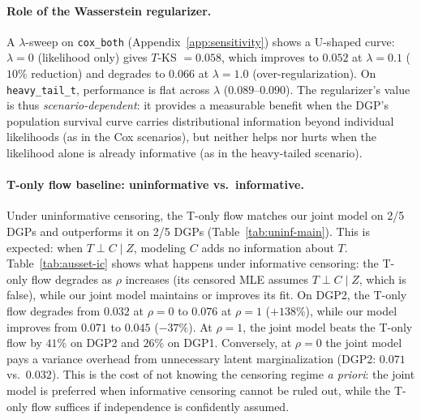 \paragraph{Role of the Wasserstein regularizer.}
A $\lambda$-sweep on \texttt{cox\_both}
(Appendix~\ref{app:sensitivity}) shows a U-shaped curve: $\lambda = 0$
(likelihood only) gives $T$-KS $= 0.058$, which improves to $0.052$ at
$\lambda = 0.1$ ($10\%$ reduction) and degrades to $0.066$ at
$\lambda = 1.0$ (over-regularization). On \texttt{heavy\_tail\_t},
performance is flat across $\lambda$ ($0.089$--$0.090$). The
regularizer's value is thus \emph{scenario-dependent}: it provides a
measurable benefit when the DGP's population survival curve carries
distributional information beyond individual likelihoods (as in the Cox
scenarios), but neither helps nor hurts when the likelihood alone is
already informative (as in the heavy-tailed scenario).

\paragraph{T-only flow baseline: uninformative vs.\ informative.}
Under uninformative censoring, the T-only flow
\citep{ausset2021conditional} matches our joint model on 2/5 DGPs and
outperforms it on 2/5 DGPs (Table~\ref{tab:uninf-main}). This is
expected: when $T \perp C \mid Z$, modeling $C$ adds no information
about $T$. Table~\ref{tab:ausset-ic} shows what happens under
informative censoring: the T-only flow degrades as $\rho$ increases
(its censored MLE assumes $T \perp C \mid Z$, which is false), while
our joint model maintains or improves its fit. On DGP2, the T-only flow
degrades from $0.032$ at $\rho{=}0$ to $0.076$ at $\rho{=}1$
($+138\%$), while our model improves from $0.071$ to $0.045$
($-37\%$). At $\rho{=}1$, the joint model beats the T-only flow by
$41\%$ on DGP2 and $26\%$ on DGP1. Conversely, at $\rho{=}0$ the joint
model pays a variance overhead from unnecessary latent marginalization
(DGP2: $0.071$ vs.\ $0.032$). This is the cost of not knowing the
censoring regime \emph{a priori}: the joint model is preferred when
informative censoring cannot be ruled out, while the T-only flow
suffices if independence is confidently assumed.

